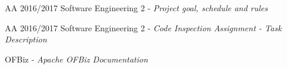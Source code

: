 \begin{thebibliography}{9}

	AA 2016/2017 Software Engineering 2 - \emph{Project goal, schedule and rules}

	AA 2016/2017 Software Engineering 2 - \emph{Code Inspection Assignment - Task Description}
	
	OFBiz - \emph{Apache OFBiz Documentation}

\end{thebibliography}